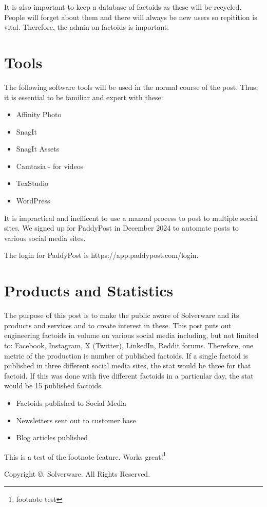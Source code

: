\documentclass[11pt,letterpaper]{article}
\newcommand{\sectiontitle}[1]{\section*{\large \textbf{#1}}}
\begin{document}
It is also important to keep a database of factoids as these will be recycled. People will forget about them and there will always be new users so repitition is vital. Therefore, the admin on factoids is important. 


\sectiontitle{Tools}
The following software tools will be used in the normal course of the post. Thus, it is essential to be familiar and expert with these:

\begin{itemize}
	\item Affinity Photo
	\item SnagIt
	\item SnagIt Assets
	\item Camtasia - for videos
	\item TexStudio
	\item WordPress
\end{itemize}
It is impractical and inefficent to use a manual process to post to multiple social sites. We signed up for PaddyPost in December 2024 to automate posts to various social media sites.

The login for PaddyPost is https://app.paddypost.com/login.


\sectiontitle{Products and Statistics}
The purpose of this post is to make the public aware of Solverware and its products and services and to create interest in these. This post puts out engineering factoids in volume on various social media including, but not limited to: Facebook, Instagram, X (Twitter), LinkedIn, Reddit forums. Therefore, one metric of the production is number of published factoids. If a single factoid is published in three different social media sites, the stat would be three for that factoid. If this was done with five different factoids in a particular day, the stat would be 15 published factoids.
\begin{itemize}
	\item Factoids published to Social Media
	\item Newsletters sent out to customer base
	\item Blog articles published
\end{itemize}

This is a test of the footnote feature. Works great!\footnote{footnote test}


Copyright \copyright {}. Solverware. All Rights Reserved.
\end{document}
